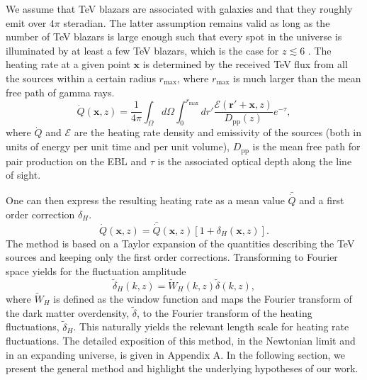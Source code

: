 \documentclass[numberedappendix]{emulateapj}
\newcommand\Cc[1]{{\color{blue} \bf #1}} %
\begin{document}
We assume that TeV blazars are associated with galaxies and that they roughly emit over $4\pi$ steradian. The latter assumption remains valid as long as the number of TeV blazars is large enough such that every spot in the universe is illuminated by at least a few TeV blazars, which is the case for $z\lesssim 6$ \citep{2012ApJ...752...23C}.
The heating rate at a given point $\mathbf{x}$ is determined by the received TeV flux from all the sources within a certain radius $r_{\mathrm{max}}$, where $r_{\mathrm{max}}$ is much larger than the mean free path of gamma rays.
\begin{equation}
\label{eq:heating_rate}
\dot{Q}(\mathbf{x},z)= \frac{1}{4\pi} \int_{\Omega} d\Omega\int_0^{r_{\mathrm{max}}} dr'\frac{\mathcal{E}(\mathbf{r}'+\mathbf{x},z)}{D_{\mathrm{pp}}(z)} e^{-\tau},
\end{equation}
where $\dot{Q}$ and $\mathcal{E}$ are the heating rate density and emissivity of the sources (both in units of energy per unit time and per unit volume), $D_{\mathrm{pp}}$ is the mean free path for pair production on the EBL and $\tau$ is the associated optical depth along the line of sight.

One can then express the resulting heating rate as a mean value $\bar{\dot{Q}}$ and a first order correction $\delta_H$.
\begin{equation}
\label{eq:delta_h}
\dot{Q}(\mathbf{x},z)=\bar{\dot{Q}}(\mathbf{x},z)\left[1+\delta_H(\mathbf{x},z)\right].
\end{equation}
The method is based on a Taylor expansion of the quantities describing the TeV sources and keeping only the first order corrections. Transforming to Fourier space yields for the fluctuation amplitude
\begin{equation}
\label{eq:use_window}
\tilde{\delta}_H(k,z)=\tilde{W}_H(k,z)\tilde{\delta}(k,z),
\end{equation}
where $\tilde{W}_H$ is defined as the window function and maps the Fourier transform of the dark matter overdensity, $\tilde{\delta}$, to the Fourier transform of the heating fluctuations, $\tilde{\delta}_H$. This naturally yields the relevant length scale for heating rate fluctuations. %
The detailed exposition of this method, in the Newtonian limit and in an expanding universe, is given in Appendix A. In the following section, we present the general method and highlight the underlying hypotheses of our work.
\end{document}
